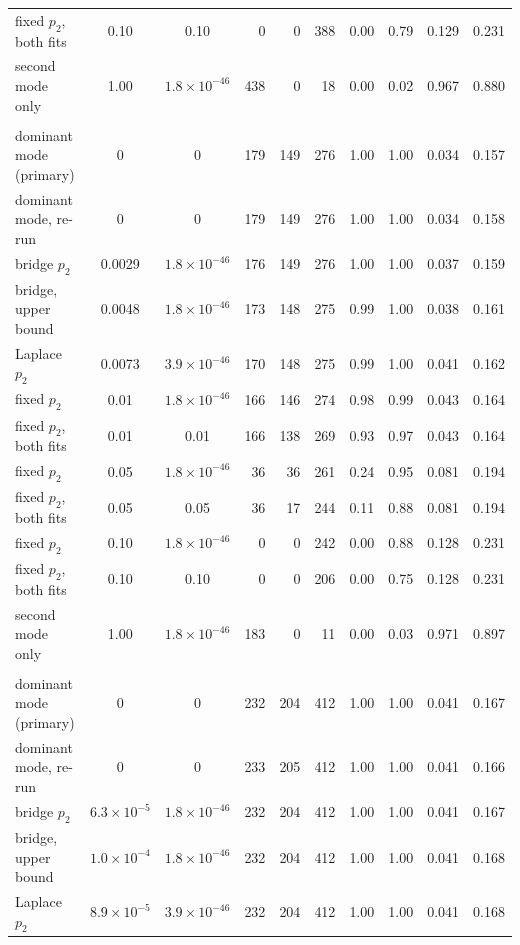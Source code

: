 \begin{table}[htbp]
\begin{tabular}{@{}lccrrrcccc@{}}
fixed $p_2$, both fits & 0.10 & 0.10 & 0 & 0 & 388 & 0.00 & 0.79 & 0.129 & 0.231 \\
second mode only & 1.00 & $1.8\times 10^{-46}$ & 438 & 0 & 18 & 0.00 & 0.02 & 0.967 & 0.880 \\
\addlinespace[3pt]
\multicolumn{10}{@{}l}{\emph{Kidney}} \\
dominant mode (primary) & 0 & 0 & 179 & 149 & 276 & 1.00 & 1.00 & 0.034 & 0.157 \\
dominant mode, re-run & 0 & 0 & 179 & 149 & 276 & 1.00 & 1.00 & 0.034 & 0.158 \\
bridge $p_2$ & 0.0029 & $1.8\times 10^{-46}$ & 176 & 149 & 276 & 1.00 & 1.00 & 0.037 & 0.159 \\
bridge, upper bound & 0.0048 & $1.8\times 10^{-46}$ & 173 & 148 & 275 & 0.99 & 1.00 & 0.038 & 0.161 \\
Laplace $p_2$ & 0.0073 & $3.9\times 10^{-46}$ & 170 & 148 & 275 & 0.99 & 1.00 & 0.041 & 0.162 \\
fixed $p_2$ & 0.01 & $1.8\times 10^{-46}$ & 166 & 146 & 274 & 0.98 & 0.99 & 0.043 & 0.164 \\
fixed $p_2$, both fits & 0.01 & 0.01 & 166 & 138 & 269 & 0.93 & 0.97 & 0.043 & 0.164 \\
fixed $p_2$ & 0.05 & $1.8\times 10^{-46}$ & 36 & 36 & 261 & 0.24 & 0.95 & 0.081 & 0.194 \\
fixed $p_2$, both fits & 0.05 & 0.05 & 36 & 17 & 244 & 0.11 & 0.88 & 0.081 & 0.194 \\
fixed $p_2$ & 0.10 & $1.8\times 10^{-46}$ & 0 & 0 & 242 & 0.00 & 0.88 & 0.128 & 0.231 \\
fixed $p_2$, both fits & 0.10 & 0.10 & 0 & 0 & 206 & 0.00 & 0.75 & 0.128 & 0.231 \\
second mode only & 1.00 & $1.8\times 10^{-46}$ & 183 & 0 & 11 & 0.00 & 0.03 & 0.971 & 0.897 \\
\addlinespace[3pt]
\multicolumn{10}{@{}l}{\emph{Lung}} \\
dominant mode (primary) & 0 & 0 & 232 & 204 & 412 & 1.00 & 1.00 & 0.041 & 0.167 \\
dominant mode, re-run & 0 & 0 & 233 & 205 & 412 & 1.00 & 1.00 & 0.041 & 0.166 \\
bridge $p_2$ & $6.3\times 10^{-5}$ & $1.8\times 10^{-46}$ & 232 & 204 & 412 & 1.00 & 1.00 & 0.041 & 0.167 \\
bridge, upper bound & $1.0\times 10^{-4}$ & $1.8\times 10^{-46}$ & 232 & 204 & 412 & 1.00 & 1.00 & 0.041 & 0.168 \\
Laplace $p_2$ & $8.9\times 10^{-5}$ & $3.9\times 10^{-46}$ & 232 & 204 & 412 & 1.00 & 1.00 & 0.041 & 0.168 \\

\end{tabular}
\end{table}
